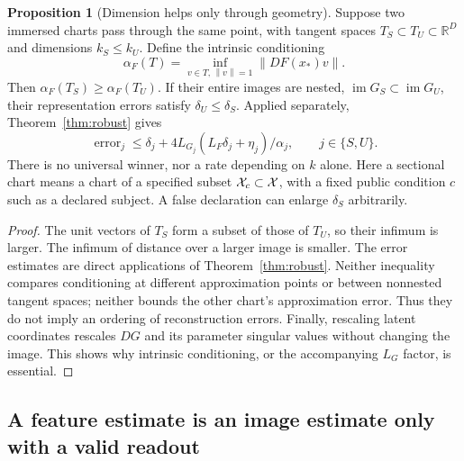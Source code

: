 \documentclass[11pt,a4paper]{article}
\theoremstyle{definition}
\newtheorem{proposition}[theorem]{Proposition}
\theoremstyle{definition}
\theoremstyle{remark}\newtheorem{remark}[theorem]{Remark}
\newcommand{\R}{\mathbb R}\newcommand{\Prob}{\mathbb P}\newcommand{\E}{\mathbb E}
\newcommand{\im}{\operatorname{im}}\newcommand{\dist}{\operatorname{dist}}
\newcommand{\norm}[1]{\left\lVert #1\right\rVert}
\begin{document}
\begin{proposition}[Dimension helps only through geometry]\label{prop:sectional}
Suppose two immersed charts pass through the same point, with tangent spaces $T_S\subset T_U\subset\R^D$ and dimensions $k_S\le k_U$. Define the intrinsic conditioning
\[
\alpha_F(T)=\inf_{v\in T,\,\norm v=1}\norm{DF(x_*)v}.
\]
Then $\alpha_F(T_S)\ge\alpha_F(T_U)$. If their entire images are nested, $\im G_S\subset\im G_U$, their representation errors satisfy $\delta_U\le\delta_S$. Applied separately, Theorem~\ref{thm:robust} gives
\[
\operatorname{error}_j\le\delta_j+4L_{G_j}(L_F\delta_j+\eta_j)/\alpha_j,
\qquad j\in\{S,U\}.
\]
There is no universal winner, nor a rate depending on $k$ alone. Here a sectional chart means a chart of a specified subset $\mathcal X_c\subset\mathcal X$, with a fixed public condition $c$ such as a declared subject. A false declaration can enlarge $\delta_S$ arbitrarily.
\end{proposition}
\begin{proof}
The unit vectors of $T_S$ form a subset of those of $T_U$, so their infimum is larger. The infimum of distance over a larger image is smaller. The error estimates are direct applications of Theorem~\ref{thm:robust}. Neither inequality compares conditioning at different approximation points or between nonnested tangent spaces; neither bounds the other chart's approximation error. Thus they do not imply an ordering of reconstruction errors. Finally, rescaling latent coordinates rescales $DG$ and its parameter singular values without changing the image. This shows why intrinsic conditioning, or the accompanying $L_G$ factor, is essential.
\end{proof}

\subsection{A feature estimate is an image estimate only with a valid readout}
\end{document}
